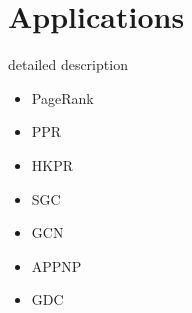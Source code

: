 
\section{Applications} \label{sec:applications}

detailed description

\begin{itemize}
	\item PageRank
	\item PPR
	\item HKPR
\end{itemize}
 

\begin{itemize}
	\item SGC
	\item GCN
	\item APPNP
	\item GDC
\end{itemize}




